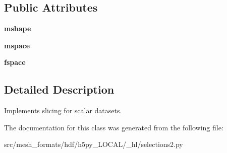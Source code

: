 \subsection*{Public Attributes}
\begin{DoxyCompactItemize}
\item 
\mbox{\label{classh5py__LOCAL_1_1__hl_1_1selections2_1_1ScalarReadSelection_a981b2872d05fc2d3967c92586cd98e38}} 
{\bfseries mshape}
\item 
\mbox{\label{classh5py__LOCAL_1_1__hl_1_1selections2_1_1ScalarReadSelection_a883e3c4393e5e0229fd9035ad2f62f93}} 
{\bfseries mspace}
\item 
\mbox{\label{classh5py__LOCAL_1_1__hl_1_1selections2_1_1ScalarReadSelection_a5a256ea6649ab240f59ce5a12fecdd9b}} 
{\bfseries fspace}
\end{DoxyCompactItemize}


\subsection{Detailed Description}
\begin{DoxyVerb}    Implements slicing for scalar datasets.
\end{DoxyVerb}
 

The documentation for this class was generated from the following file\+:\begin{DoxyCompactItemize}
\item 
src/mesh\+\_\+formats/hdf/h5py\+\_\+\+L\+O\+C\+A\+L/\+\_\+hl/selections2.\+py\end{DoxyCompactItemize}
